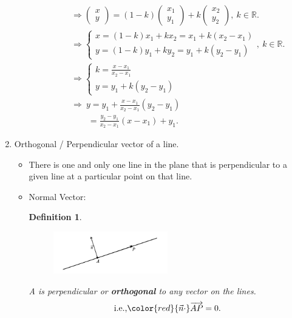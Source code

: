 \documentclass[12pt, a4paper]{article}
\newtheorem{definition}{Definition}[subsection]
\begin{document}
\begin{enumerate}
\begin{itemize}
\begin{enumerate}
$$\begin{aligned}
        &\Rightarrow \begin{pmatrix}x\\y\end{pmatrix}=\left(1-k\right)\begin{pmatrix}x_1\\y_1\end{pmatrix}+k\begin{pmatrix}x_2\\y_2\end{pmatrix},\ k\in\mathbb{R}.\\
        &\Rightarrow \begin{cases}x=(1-k)x_1+kx_2=x_1+k(x_2-x_1)\\y=(1-k)y_1+ky_2=y_1+k(y_2-y_1)\end{cases},\ k\in\mathbb{R}.\\
        &\Rightarrow \begin{cases}k=\frac{x-x_1}{x_2-x_1}\\y=y_1+k(y_2-y_1)\end{cases}\\
        &\Rightarrow\ y=y_1+\frac{x-x_1}{x_2-x_1}(y_2-y_1)\\
        &\ \ \ \ \ \ \ \ \ =\frac{y_2-y_1}{x_2-x_1}(x-x_1)+y_1.
      \end{aligned}$$
    \end{enumerate}
  \end{itemize}
  \item Orthogonal / Perpendicular vector of a line. 
  \begin{itemize}
    \item There is one and only one line in the plane that is perpendicular to a given line at a particular point on that line. 
    \item Normal Vector: 
    \begin{definition}
      \begin{figure}[H]
        \centering
        \includegraphics[width=0.5\textwidth]{Fig.3.9.jpg}
      \end{figure}
      A \textbf{\color{red}{normal vector}} is perpendicular or \textbf{orthogonal} to any vector on the lines. 
      $$\text{i.e.,}{\color{red}{\vec{n}\cdot}\overrightarrow{AP}=0}.$$
    \end{definition}

\end{itemize}
\end{enumerate}
\end{document}
